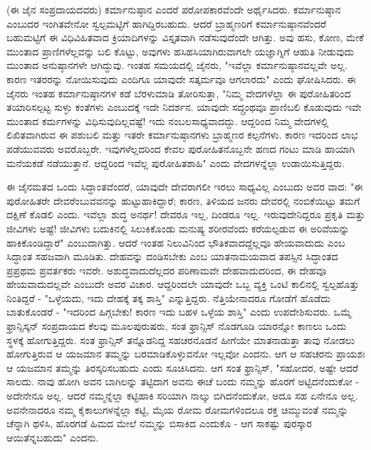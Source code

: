(ಈ ಜೈನ ಸಂಪ್ರದಾಯದವರು) ಕರ್ಮಾನುಷ್ಠಾನ ಎಂದರೆ ಪರೋಪಕಾರವೆಂದೇ ಅರ್ಥೈಸಿದರು. ಕರ್ಮಾನುಷ್ಠಾನ ಎಂಬುದರ ಇಂಗಿತವೇನೋ ಸ್ವಲ್ಪಮಟ್ಟಿಗೆ ಹಾಗಿದ್ದಿರಬಹುದು. ಆದರೆ ಬ್ರಾಹ್ಮಣರಿಗೆ ಕರ್ಮಾನುಷ್ಠಾನವೆಂದರೆ ಬಹುಮಟ್ಟಿಗೆ ಈ ವಿಧಿವಿಹಿತವಾದ ಕ್ರಿಯಾದಿಗಳನ್ನು ವಿಸ್ತೃತವಾಗಿ ನಡೆಸುವುದೆಂದೇ ಆಗಿತ್ತು. ಅವು ಹಸು, ಕೋಣ, ಮೇಕೆ ಮುಂತಾದ ಪ್ರಾಣಿಗಳೆಲ್ಲವನ್ನು ಬಲಿ ಕೊಟ್ಟು, ಅವುಗಳು ಹಸಿಹಸಿಯಾಗಿರುವಾಗಲೇ ಯಜ್ಞಾಗ್ನಿಗೆ ಆಹುತಿ ನೀಡುವುದು ಮುಂತಾದ ಅನುಷ್ಠಾನಗಳೇ ಆಗಿದ್ದುವು. ಇಂತಹ ಸಮಯದಲ್ಲಿ ಜೈನರು, "ಇವೆಲ್ಲಾ ಕರ್ಮಾನುಷ್ಠಾನವಲ್ಲವೇ ಅಲ್ಲ. ಕಾರಣ ಇತರರನ್ನು ನೋಯಿಸುವುದು ಎಂದಿಗೂ ಯಾವುದೇ ಸತ್ಕರ್ಮವೂ ಆಗಲಾರದು" ಎಂದು ಘೋಷಿಸಿದರು. ಈ ಜೈನರು ಇಂತಹ ಕರ್ಮಾನುಷ್ಠಾನಗಳ ಕಡೆ ಬೆರಳುಮಾಡಿ ತೋರಿಸುತ್ತಾ, "ನಿಮ್ಮ ವೇದಗಳೆಲ್ಲಾ ಈ ಪುರೋಹಿತರಿಂದ ತಯಾರಿಸಲ್ಪಟ್ಟ ಸುಳ್ಳು ಕಂತೆಗಳು ಎಂಬುದಕ್ಕೆ ಇದೇ ನಿದರ್ಶನ. ಯಾವುದೇ ಸದ್ಗ್ರಂಥವೂ ಪ್ರಾಣಿಬಲಿ ಕೊಡುವುದು ಇವೇ ಮುಂತಾದ ಕರ್ಮಗಳನ್ನು ವಿಧಿಸುವುದಿಲ್ಲವಷ್ಟೆ! ಇದು ನಂಬಲಸಾಧ್ಯವಾದದ್ದು. ಆದ್ದರಿಂದ ನಿಮ್ಮ ವೇದಗಳಲ್ಲಿ ಲಿಖಿತವಾಗಿರುವ ಈ ಪಶುಬಲಿ ಮತ್ತು ಇತರೇ ಕರ್ಮಾನುಷ್ಠಾನಗಳು ಬ್ರಾಹ್ಮಣರ ಕಲ್ಪನೆಗಳು. ಕಾರಣ ಇದರಿಂದ ಲಾಭ ಪಡೆಯುವವರು ಅವರೊಬ್ಬರೇ. ಇವುಗಳೆಲ್ಲದರಿಂದ ಕೇವಲ ಪುರೋಹಿತನೊಬ್ಬನೇ ಹಣದ ಗಂಟು ಮಾಡಿ ಹಾಯಾಗಿ ಮನೆಯಕಡೆ ನಡೆಯುತ್ತಾನೆ. ಆದ್ದರಿಂದ ಇವೆಲ್ಲ ಪುರೋಹಿತಶಾಹಿ" ಎಂದು ವೇದಗಳನ್ನೆಲ್ಲಾ ಉಡಾಯಿಸುತ್ತಿದ್ದರು.

ಈ ಜೈನಮತದ ಒಂದು ಸಿದ್ಧಾಂತವೆಂದರೆ, ಯಾವುದೇ ದೇವರಾಗಲೀ ಇರಲು ಸಾಧ್ಯವಿಲ್ಲ ಎಂಬುದು ಅವರ ವಾದ: "ಈ ಪುರೋಹಿತರೇ ದೇವರೆಂಬುವವನನ್ನು ಹುಟ್ಟುಹಾಕಿದ್ದಾರೆ; ಕಾರಣ, ತಿಳಿಯದ ಜನರು ದೇವರಲ್ಲಿ ನಂಬಿಕೆಯಿಟ್ಟು ತಮಗೆ ದಕ್ಷಿಣೆ ಕೊಡಲಿ ಎಂದು. ಇವೆಲ್ಲಾ ಶುದ್ಧ ಅನರ್ಥ! ದೇವರೂ ಇಲ್ಲ, ದಿಂಡರೂ ಇಲ್ಲ. ಇರುವುದೇನಿದ್ದರೂ ಪ್ರಕೃತಿ ಮತ್ತು ಜೀವಿಗಳು ಅಷ್ಟೆ! ಜೀವಿಗಳು ಬದುಕಿನಲ್ಲಿ ಸಿಲುಕಿಕೊಂಡು ಮನುಷ್ಯ ಶರೀರವೆಂದು ಕರೆಯಲ್ಪಡುವ ಈ ಅರಿವೆಯನ್ನು ಹಾಕಿಕೊಂಡಿದ್ದಾರೆ" ಎಂಬುದಾಗಿತ್ತು. ಆದರೆ ಇಂತಹ ನಿಲುವಿನಿಂದ ಭೌತಿಕವಾದದ್ದೆಲ್ಲವೂ ಹೇಯವಾದುದು ಎಂಬ ಸಿದ್ಧಾಂತ ಸಹಜವಾಗಿ ಮೂಡಿತು. ದೇಹವನ್ನು ದಂಡಿಸಬೇಕು ಎಂಬ ಯಾತನಾಮಯವಾದ ತಪಸ್ಸಿನ ಸಿದ್ಧಾಂತದ ಪ್ರಪ್ರಥಮ ಪ್ರವರ್ತಕರು ಇವರೇ. ಅಶುದ್ಧವಾದುದೆಲ್ಲದರ ಪರಿಣಾಮವೇ ದೇಹವಾದುದರಿಂದ, ಈ ದೇಹವೂ ಹೇಯವಾದುದಲ್ಲವೇ ಎಂಬುದೇ ಅವರ ವಿಚಾರ. ಆದ್ದರಿಂದಲೇ ಯಾವುದೇ ಒಬ್ಬ ವ್ಯಕ್ತಿ ಒಂಟಿ ಕಾಲಿನಲ್ಲಿ ಸ್ವಲ್ಪಹೊತ್ತು ನಿಂತಿದ್ದರೆ - "ಒಳ್ಳೆಯದು, ಇದು ದೇಹಕ್ಕೆ ತಕ್ಕ ಶಾಸ್ತಿ" ಎನ್ನುತ್ತಿದ್ದರು. ನೆತ್ತಿಯೇನಾದರೂ ಗೋಡೆಗೆ ಹೊಡೆದು ಬಾತುಕೊಂಡರೆ - "ಇದರಿಂದ ಹಿಗ್ಗಬೇಕು! ಕಾರಣ ಇದು ಬಹಳ ಒಳ್ಳೆಯ ಶಾಸ್ತಿ" ಎಂದು ಉಪದೇಶಿಸುವರು. ಒಮ್ಮೆ ಫ್ರಾನ್ಸಿಸ್ಕನ್ ಸಂಪ್ರದಾಯದ ಕೆಲವು ಮೂಲಪುರುಷರು, ಸಂತ ಫ್ರಾನ್ಸಿಸ್ ನೊಡಗೂಡಿ ಯಾರನ್ನೋ ಕಾಣಲು ಒಂದು ಸ್ಥಳಕ್ಕೆ ಹೋಗುತ್ತಿದ್ದರು. ಸಂತ ಫ್ರಾನ್ಸಿಸ್ ತನ್ನೊಡನಿದ್ದ ಸಹಚರನೊಡನೆ ಹೀಗೆಯೇ ಮಾತನಾಡುತ್ತಾ ತಾವು ನೋಡಲು ಹೋಗುತ್ತಿರುವ ಆ ಯಜಮಾನ ತಮ್ಮನ್ನು ಬರಮಾಡಿಕೊಳ್ಳುವನೋ ಇಲ್ಲವೋ ಎಂದನು. ಆಗ ಆ ಸಹಚರನು ಪ್ರಾಯಶಃ ಆ ಯಜಮಾನ ತಮ್ಮನ್ನು ತಿರಸ್ಕರಿಸಬಹುದು ಎಂದು ಸೂಚಿಸಿದನು. ಆಗ ಸಂತ ಫ್ರಾನ್ಸಿಸ್, "ಸಹೋದರ, ಅಷ್ಟೇ ಆದರೆ ಸಾಲದು. ನಾವು ಹೋಗಿ ಅವನ ಬಾಗಿಲನ್ನು ತಟ್ಟಿದಾಗ ಅವನು ಈಚೆ ಬಂದು ನಮ್ಮನ್ನು ಹೊರಗೆ ಅಟ್ಟಿದನೆಂದುಕೋ - ಅದೇನೇನೂ ಅಲ್ಲ. ಆದರೆ ನಮ್ಮನ್ನೆಲ್ಲಾ ಕಟ್ಟಿಹಾಕಿ ಸರಿಯಾಗಿ ನಾಲ್ಕು ಬಿಗಿದನೆಂದುಕೋ, ಅದೂ ಸಹ ಏನೇನೂ ಅಲ್ಲ. ಅವನೇನಾದರೂ ನಮ್ಮ ಕೈಕಾಲುಗಳನ್ನೆಲ್ಲಾ ಕಟ್ಟಿ, ಮೈಯ ರೋಮ ರೋಮಗಳಿಂದಲೂ ರಕ್ತ ಚಿಮ್ಮುವಂತೆ ನಮ್ಮನ್ನು ಚೆನ್ನಾಗಿ ಥಳಿಸಿ, ಹೊರಗಡೆ ಹಿಮದ ಮೇಲೆ ನಮ್ಮನ್ನು ಬಿಸಾಕಿದ ಎಂದುಕೊ - ಆಗ ಸಾಕಷ್ಟು ಪುರಸ್ಕಾರ ಆಯಿತೆನ್ನಬಹುದು" ಎಂದನು.

